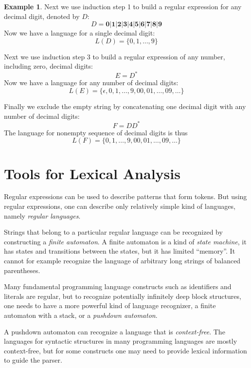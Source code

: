 \documentclass[a4paper,oneside,11pt]{book}
\theoremstyle{definition}
\newtheorem{exmp}{Example}[section]
\begin{document}
\begin{flushleft}
\begin{exmp}
Next we use induction step 1 to build a regular expression for any decimal digit, denoted by $D$:
$$D = \textbf{0} | \textbf{1} | \textbf{2} | \textbf{3} | \textbf{4} | \textbf{5} | \textbf{6} | \textbf{7} | \textbf{8} | \textbf{9}$$
Now we have a language for a single decimal digit: $$L(D) = \{0, 1, \ldots, 9\}$$

Next we use induction step 3 to build a regular expression of any number, including zero, decimal digits:
$$E = D^*$$
Now we have a language for any number of decimal digits: $$L(E) = \{\epsilon, 0, 1, \ldots, 9, 00, 01, \ldots, 09, \ldots \}$$

Finally we exclude the empty string by concatenating one decimal digit with any number of decimal digits:
$$F = DD^*$$
The language for nonempty sequence of decimal digits is thus $$L(F) = \{0, 1, \ldots, 9, 00, 01, \ldots, 09, \ldots \}$$
\end{exmp}

\end{flushleft}

\clearpage

\section{Tools for Lexical Analysis}

Regular expressions can be used to describe patterns that form tokens.
But using regular expressions, one can describe only relatively simple kind of languages, namely \emph{regular languages}.

Strings that belong to a particular regular language can be recognized by constructing a \emph{finite automaton}.
A finite automaton is a kind of \emph{state machine}, it has states and transitions between the states,
but it has limited ``memory''. It cannot for example recognize the language of arbitrary long strings of balanced parentheses.

Many fundamental programming language constructs such as identifiers and literals are regular,
but to recognize potentially infinitely deep block structures, one needs to have a more powerful kind of language recognizer,
a finite automaton with a stack, or a \emph{pushdown automaton}.

A pushdown automaton can recognize a language that is
\emph{context-free}. The languages for syntactic structures in many programming languages are mostly context-free,
but for some constructs one may need to provide lexical information to guide the parser.
\end{document}
